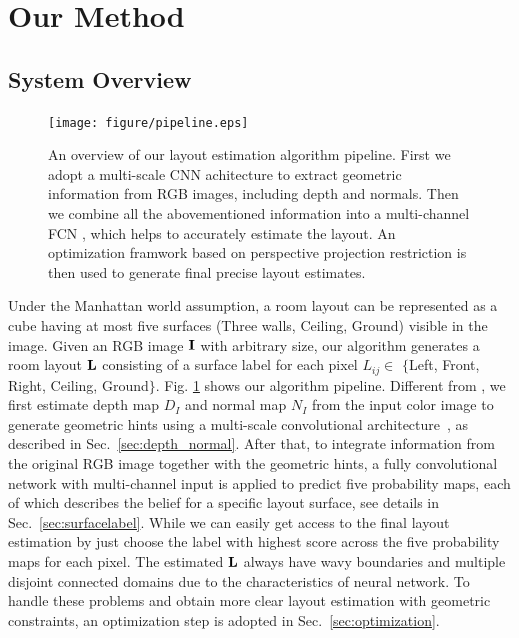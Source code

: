 \section{Our Method}
\label{sec:Meth}


\subsection{System Overview}
\label{subsection:overview}

\begin{figure}[!ht]
	\centering
	\texttt{[image: figure/pipeline.eps]}
	\caption{An overview of our layout estimation algorithm pipeline. First we adopt a multi-scale CNN achitecture \cite{eigen2015predicting} to extract geometric information from RGB images, including depth and normals. Then we combine all the abovementioned information into a multi-channel FCN , which helps to accurately estimate the layout. An optimization framwork based on perspective projection restriction is then used to generate final precise layout estimates.}
	\label{fig:pipeline}
\end{figure}

Under the Manhattan world assumption, a room layout can be represented as a cube having at most five surfaces (Three walls, Ceiling, Ground) visible in the image. 
%
Given an RGB image $\mathbf{I}$ with arbitrary size, our algorithm generates a room layout $\mathbf{L}$ consisting of a surface label for each pixel $L_{ij}\in $ $\{$Left, Front, Right, Ceiling, Ground$\}$. 
Fig. \ref{fig:pipeline} shows our algorithm pipeline. 
Different from \cite{dasgupta2016delay}, we first estimate depth map $D_{I}$ and normal map $N_{I}$ from the input color image to generate geometric hints using a multi-scale convolutional architecture~\cite{eigen2015predicting}, as described in Sec.~\ref{sec:depth_normal}.
After that, to integrate information from the original RGB image together with the geometric hints, a fully convolutional network with multi-channel input is applied to predict five probability maps, each of which describes the belief for a specific layout surface, see details in Sec.~\ref{sec:surfacelabel}.
While we can easily get access to the final layout estimation by just choose the label with highest score across the five probability maps for each pixel. 
The estimated $\mathbf{L}$ always have wavy boundaries and multiple disjoint connected domains due to the characteristics of neural network. To handle these problems and obtain more clear layout estimation with geometric constraints, an optimization step is adopted in Sec.~\ref{sec:optimization}.  
 

